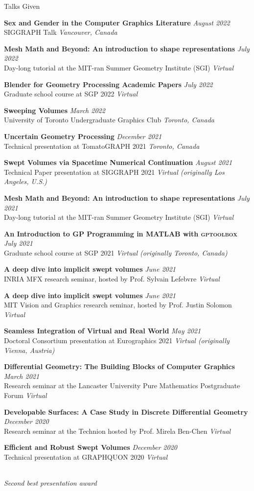 \documentclass{resume}
\newcommand{\talk}[4]{
    {\bf #1} \hfill {\em \small #2} \\ %
    {\small #3} \hfill {\em \small #4}
}
\begin{document}
\begin{rSection}{Talks Given}

\talk{Sex and Gender in the Computer Graphics Literature}{August 2022}{SIGGRAPH Talk}{Vancouver, Canada}

\talk{Mesh Math and Beyond: An introduction to shape representations}{July 2022}{Day-long tutorial at the MIT-ran Summer Geometry Institute (SGI)}{Virtual}

\talk{Blender for Geometry Processing Academic Papers}{July 2022}{Graduate school course at SGP 2022}{Virtual}

\talk{Sweeping Volumes}{March 2022}
{University of Toronto Undergraduate Graphics Club}{Toronto, Canada}

\talk{Uncertain Geometry Processing}{December 2021}
{Technical presentation at TomatoGRAPH 2021}{Toronto, Canada}

\talk{Swept Volumes via Spacetime Numerical Continuation}{August 2021}
{Technical Paper presentation at SIGGRAPH 2021}{Virtual (originally Los Angeles, U.S.)}

\talk{Mesh Math and Beyond: An introduction to shape representations}{July 2021}
{Day-long tutorial at the MIT-ran Summer Geometry Institute (SGI)}{Virtual}

\talk{An Introduction to GP Programming in MATLAB with \textsc{gptoolbox}}{July 2021}
{Graduate school course at SGP 2021}{Virtual (originally Toronto, Canada)}

\talk{A deep dive into implicit swept volumes}{June 2021}
{INRIA MFX research seminar, hosted by Prof. Sylvain Lefebvre}{Virtual}

\talk{A deep dive into implicit swept volumes}{June 2021}
{MIT Vision and Graphics research seminar, hosted by Prof. Justin Solomon}{Virtual}

\talk{Seamless Integration of Virtual and Real World}{May 2021}
{Doctoral Consortium presentation at Eurographics 2021}{Virtual (originally Vienna, Austria)}

\talk{Differential Geometry: The Building Blocks of Computer Graphics}{March 2021}
{Research seminar at the Lancaster University Pure Mathematics Postgraduate Forum}{Virtual}

\talk{Developable Surfaces: A Case Study in Discrete Differential Geometry}{December 2020}
{Research seminar at the Technion hosted by Prof. Mirela Ben-Chen}{Virtual}

\talk{Efficient and Robust Swept Volumes}{December 2020}
{Technical presentation at GRAPHQUON 2020}{Virtual}
\\{\it Second best presentation award}


\end{rSection}
\end{document}
